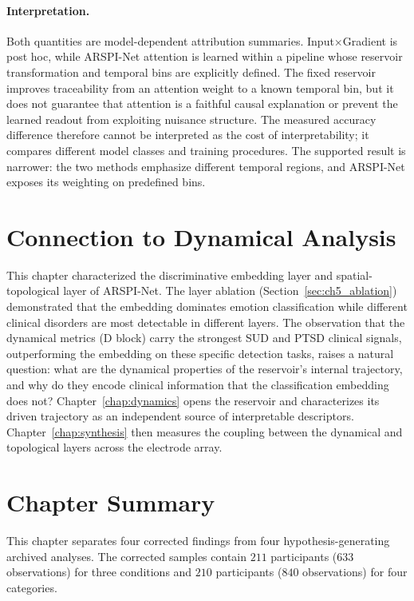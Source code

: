\paragraph{Interpretation.} Both quantities are model-dependent attribution summaries. Input$\times$Gradient is post hoc, while ARSPI-Net attention is learned within a pipeline whose reservoir transformation and temporal bins are explicitly defined. The fixed reservoir improves traceability from an attention weight to a known temporal bin, but it does not guarantee that attention is a faithful causal explanation or prevent the learned readout from exploiting nuisance structure. The measured accuracy difference therefore cannot be interpreted as the cost of interpretability; it compares different model classes and training procedures. The supported result is narrower: the two methods emphasize different temporal regions, and ARSPI-Net exposes its weighting on predefined bins.




\section{Connection to Dynamical Analysis}
\label{sec:ch5_bridge}

This chapter characterized the discriminative embedding layer and spatial-topological layer of ARSPI-Net. The layer ablation (Section~\ref{sec:ch5_ablation}) demonstrated that the embedding dominates emotion classification while different clinical disorders are most detectable in different layers. The observation that the dynamical metrics (D block) carry the strongest SUD and PTSD clinical signals, outperforming the embedding on these specific detection tasks, raises a natural question: what are the dynamical properties of the reservoir's internal trajectory, and why do they encode clinical information that the classification embedding does not? Chapter~\ref{chap:dynamics} opens the reservoir and characterizes its driven trajectory as an independent source of interpretable descriptors. Chapter~\ref{chap:synthesis} then measures the coupling between the dynamical and topological layers across the electrode array.


\section{Chapter Summary}
\label{sec:ch5_summary}

This chapter separates four corrected findings from four hypothesis-generating archived analyses. The corrected samples contain $211$ participants ($633$ observations) for three conditions and $210$ participants ($840$ observations) for four categories.

